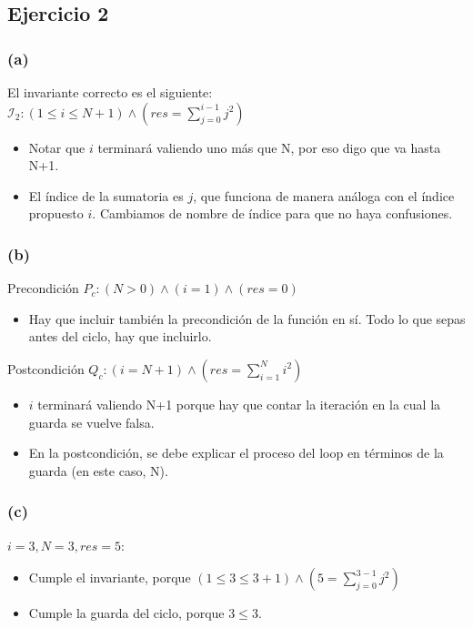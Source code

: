 \documentclass[12 pt]{article}
\begin{document}
\subsection*{Ejercicio 2}
    \subsubsection*{(a)}
        El invariante correcto es el siguiente:
        \\
        $\mathcal{I}_{2}: (1 \leq i \leq N+1) \wedge (res = \sum^{i-1}_{j=0}j^{2})$
        \begin{itemize}
            \item Notar que $i$ terminará valiendo uno más que N, por eso digo que va hasta N+1.
            \item El índice de la sumatoria es $j$, que funciona de manera análoga con el índice propuesto $i$. Cambiamos de nombre de índice para que no haya confusiones.
        \end{itemize}
    \subsubsection*{(b)}
        Precondición $P_{c}: (N>0) \wedge (i=1) \wedge (res=0)$
        \begin{itemize}
            \item Hay que incluir también la precondición de la función en sí. Todo lo que sepas antes del ciclo, hay que incluirlo.
        \end{itemize}
        Postcondición $Q_{c}: (i=N+1) \wedge (res=\sum^{N}_{i=1}i^{2})$
        \begin{itemize}
            \item $i$ terminará valiendo N+1 porque hay que contar la iteración en la cual la guarda se vuelve falsa.
            \item En la postcondición, se debe explicar el proceso del loop en términos de la guarda (en este caso, N).
        \end{itemize}
    \subsubsection*{(c)}
        $i=3, N=3, res=5$:
        \begin{itemize}
            \item Cumple el invariante, porque $(1 \leq 3 \leq 3+1) \wedge (5 = \sum^{3-1}_{j=0}j^{2})$
            \item Cumple la guarda del ciclo, porque $3 \leq 3$.
        \end{itemize}
\end{document}

